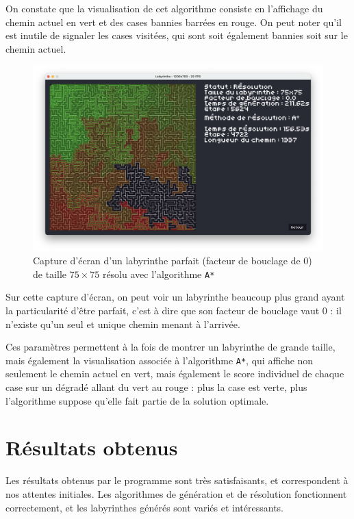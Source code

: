 \documentclass[12pt]{scrreprt} %
\begin{document}
On constate que la visualisation de cet algorithme consiste en l'affichage du chemin actuel en vert et des cases bannies barrées en rouge. On peut noter qu'il est inutile de signaler les cases visitées, qui sont soit également bannies soit sur le chemin actuel.

\begin{figure}[h]
    \centering
    \includegraphics[width=\textwidth]{images/astarsolved75-2.png}
    \caption{Capture d'écran d'un labyrinthe parfait (facteur de bouclage de $0$) de taille $75 \times 75$ résolu avec l'algorithme \texttt{A*}}
\end{figure}

Sur cette capture d'écran, on peut voir un labyrinthe beaucoup plus grand ayant la particularité d'être parfait, c'est à dire que son facteur de bouclage vaut $0$ : il n'existe qu'un seul et unique chemin menant à l'arrivée.

Ces paramètres permettent à la fois de montrer un labyrinthe de grande taille, mais également la visualisation associée à l'algorithme \texttt{A*}, qui affiche non seulement le chemin actuel en vert, mais également le score individuel de chaque case sur un dégradé allant du vert au rouge : plus la case est verte, plus l'algorithme suppose qu'elle fait partie de la solution optimale.

\section{Résultats obtenus}

Les résultats obtenus par le programme sont très satisfaisants, et correspondent à nos attentes initiales. Les algorithmes de génération et de résolution fonctionnent correctement, et les labyrinthes générés sont variés et intéressants.
\end{document}

